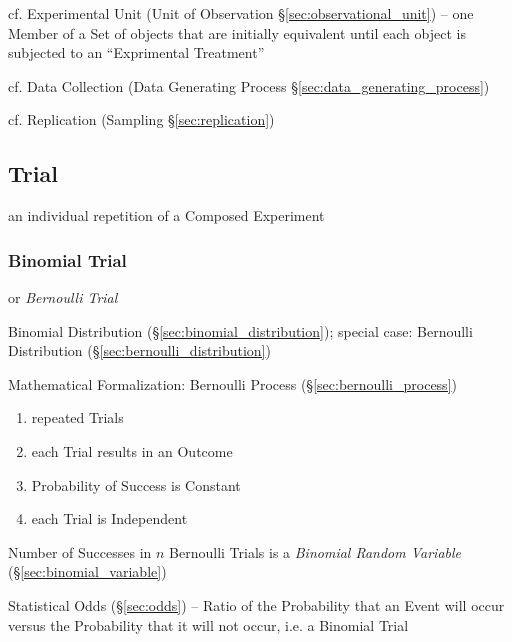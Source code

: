 \fist cf. Experimental Unit (Unit of Observation \S\ref{sec:observational_unit})
-- one Member of a Set of objects that are initially equivalent until each
object is subjected to an ``Exprimental Treatment''

\fist cf. Data Collection (Data Generating Process
\S\ref{sec:data_generating_process})

\fist cf. Replication (Sampling \S\ref{sec:replication})



\subsection{Trial}\label{sec:trial}

an individual repetition of a Composed Experiment



\subsubsection{Binomial Trial}\label{sec:binomial_trial}

or \emph{Bernoulli Trial}

Binomial Distribution (\S\ref{sec:binomial_distribution}); special case:
Bernoulli Distribution (\S\ref{sec:bernoulli_distribution})

Mathematical Formalization: Bernoulli Process (\S\ref{sec:bernoulli_process})

\begin{enumerate}
  \item repeated Trials
  \item each Trial results in an Outcome
  \item Probability of Success is Constant
  \item each Trial is Independent
\end{enumerate}

Number of Successes in $n$ Bernoulli Trials is a \emph{Binomial Random
  Variable} (\S\ref{sec:binomial_variable})

\fist Statistical Odds (\S\ref{sec:odds}) -- Ratio of the Probability that an
Event will occur versus the Probability that it will not occur, i.e. a Binomial
Trial




